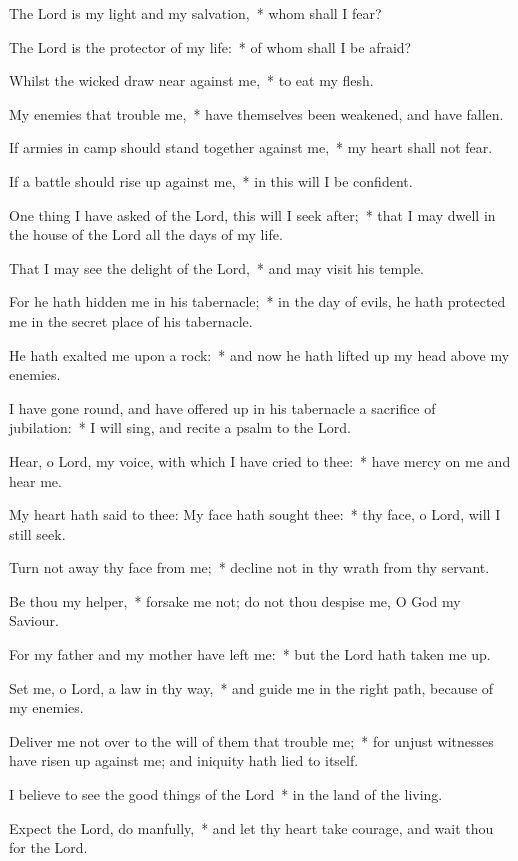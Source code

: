 \begin{enpars}
\item The Lord is my light and my salvation,~* whom shall I fear?
\item The Lord is the protector of my life:~* of whom shall I be afraid?
\item Whilst the wicked draw near against me,~* to eat my flesh.
\item My enemies that trouble me,~* have themselves been weakened, and have fallen.
\item If armies in camp should stand together against me,~* my heart shall not fear.
\item If a battle should rise up against me,~* in this will I be confident.
\item One thing I have asked of the Lord, this will I seek after;~* that I may dwell in the house of the Lord all the days of my life.
\item That I may see the delight of the Lord,~* and may visit his temple.
\item For he hath hidden me in his tabernacle;~* in the day of evils, he hath protected me in the secret place of his tabernacle.
\item He hath exalted me upon a rock:~* and now he hath lifted up my head above my enemies.
\item I have gone round, and have offered up in his tabernacle a sacrifice of jubilation:~* I will sing, and recite a psalm to the Lord.
\item Hear, o Lord, my voice, with which I have cried to thee:~* have mercy on me and hear me.
\item My heart hath said to thee: My face hath sought thee:~* thy face, o Lord, will I still seek.
\item Turn not away thy face from me;~* decline not in thy wrath from thy servant.
\item Be thou my helper,~* forsake me not; do not thou despise me, O God my Saviour.
\item For my father and my mother have left me:~* but the Lord hath taken me up.
\item Set me, o Lord, a law in thy way,~* and guide me in the right path, because of my enemies.
\item Deliver me not over to the will of them that trouble me;~* for unjust witnesses have risen up against me; and iniquity hath lied to itself.
\item I believe to see the good things of the Lord~* in the land of the living.
\item Expect the Lord, do manfully,~* and let thy heart take courage, and wait thou for the Lord.
\end{enpars}